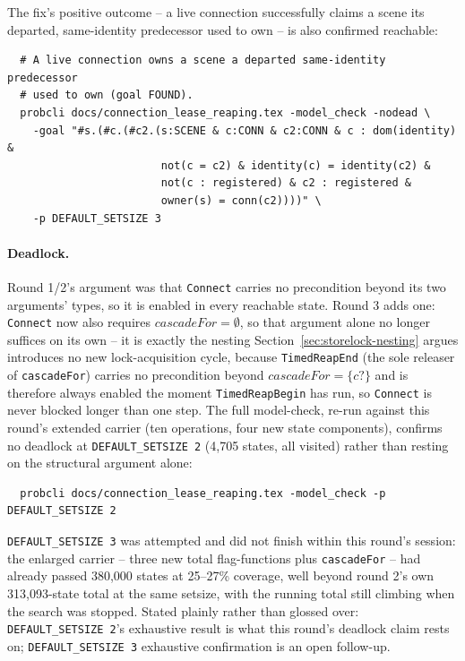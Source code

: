 \documentclass[a4paper,10pt,fleqn]{article}
\begin{document}
The fix's positive outcome -- a live connection successfully claims a
scene its departed, same-identity predecessor used to own -- is also
confirmed reachable:

\begin{verbatim}
  # A live connection owns a scene a departed same-identity predecessor
  # used to own (goal FOUND).
  probcli docs/connection_lease_reaping.tex -model_check -nodead \
    -goal "#s.(#c.(#c2.(s:SCENE & c:CONN & c2:CONN & c : dom(identity) &
                        not(c = c2) & identity(c) = identity(c2) &
                        not(c : registered) & c2 : registered &
                        owner(s) = conn(c2))))" \
    -p DEFAULT_SETSIZE 3
\end{verbatim}

\paragraph{Deadlock.} Round 1/2's argument was that \texttt{Connect} carries
no precondition beyond its two arguments' types, so it is enabled in every
reachable state. Round 3 adds one: \texttt{Connect} now also requires
\texttt{$cascadeFor = \emptyset$}, so that argument alone no longer
suffices on its own -- it is exactly the nesting
Section~\ref{sec:storelock-nesting} argues introduces no new
lock-acquisition cycle, because \texttt{TimedReapEnd} (the sole releaser of
\texttt{cascadeFor}) carries no precondition beyond \texttt{$cascadeFor =
\{c?\}$} and is therefore always enabled the moment
\texttt{TimedReapBegin} has run, so \texttt{Connect} is never blocked
longer than one step. The full model-check, re-run against this round's
extended carrier (ten operations, four new state components), confirms no
deadlock at \texttt{DEFAULT\_SETSIZE 2} (4,705 states, all visited) rather
than resting on the structural argument alone:

\begin{verbatim}
  probcli docs/connection_lease_reaping.tex -model_check -p DEFAULT_SETSIZE 2
\end{verbatim}

\texttt{DEFAULT\_SETSIZE 3} was attempted and did not finish within this
round's session: the enlarged carrier -- three new total flag-functions
plus \texttt{cascadeFor} -- had already passed 380{,}000 states at
25--27\% coverage, well beyond round 2's own 313{,}093-state total at the
same setsize, with the running total still climbing when the search was
stopped. Stated plainly rather than glossed over: \texttt{DEFAULT\_SETSIZE
2}'s exhaustive result is what this round's deadlock claim rests on;
\texttt{DEFAULT\_SETSIZE 3} exhaustive confirmation is an open follow-up.
\end{document}
